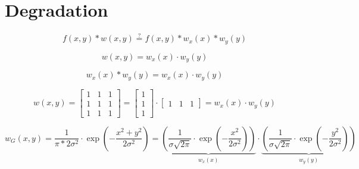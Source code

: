 \documentclass{article}
\begin{document}
\section{Degradation}
\begin{equation}
    f(x,y)*w(x,y) \stackrel{?}{=} f(x,y)*w_{x}(x)*w_{y}(y)
\end{equation}

\begin{equation}
    w(x,y) = w_{x}(x) \cdot w_{y}(y)
\end{equation}

\begin{equation}
   w_{x}(x) * w_{y}(y) = w_{x}(x) \cdot w_{y}(y) 
\end{equation}


\begin{equation}
    w(x,y) =
    \begin{bmatrix}
        1 & 1 & 1 \\
        1 & 1 & 1 \\
        1 & 1 & 1
    \end{bmatrix}
    =
    \begin{bmatrix}
        1 \\
        1 \\
        1
    \end{bmatrix}
    \cdot
    \begin{bmatrix}
    1 & 1 & 1 
    \end{bmatrix}
    =
    w_{x}(x) \cdot w_{y}(y) 
\end{equation}


\begin{equation}
    w_{G}(x,y) = \frac{1}{\pi*2\sigma^2} \cdot \exp\left(-\frac{x^2+y^2}{2\sigma^2}\right)
    = 
    \underbrace{
    \left(
    \frac{1}{\sigma \sqrt{2\pi}} \cdot \exp\left(-\frac{x^2}{2\sigma^2}\right)
    \right)
    }_{w_{x}(x)}
    \cdot
    \underbrace{
    \left(
    \frac{1}{\sigma \sqrt{2\pi}} \cdot
    \exp\left(-\frac{y^2}{2\sigma^2}\right)
    \right)
    }_{w_{y}(y)}
\end{equation}
\end{document}
